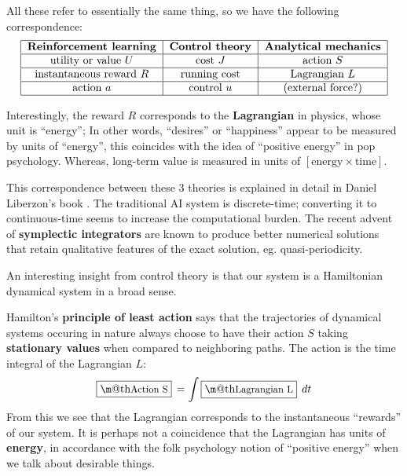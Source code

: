 \documentclass[orivec]{llncs}
\makeatletter
\newcommand{\emp}[1]{\textbf{#1}}
\renewcommand{\boxed}[1]{\fbox{\m@th$\displaystyle\scalebox{0.9}{#1}$} \,}
\makeatother
\begin{document}
All these refer to essentially the same thing, so we have the following correspondence:
\begin{equation}
\begin{tabular}{|c|c|c|}
\hline 
\emp{Reinforcement learning} & \emp{Control theory} & \emp{Analytical mechanics} \\ 
\hline
utility or value $U$ & cost $J$ & action $S$ \\ 
\hline 
instantaneous reward $R$ & running cost & Lagrangian $L$ \\ 
\hline 
action $a$ & control $u$ & (external force?) \\
\hline
\end{tabular} 
\end{equation}


Interestingly, the reward $R$ corresponds to the \textbf{Lagrangian} in physics, whose unit is ``energy'';  In other words, ``desires'' or ``happiness'' appear to be measured by units of ``energy'', this coincides with the idea of ``positive energy'' in pop psychology.  Whereas, long-term value is measured in units of $[\mbox{energy} \times \mbox{time}]$.


This correspondence between these 3 theories is explained in detail in Daniel Liberzon's book \cite{Liberzon2012}.  The traditional AI system is discrete-time; converting it to continuous-time seems to increase the computational burden.  The recent advent of \textbf{symplectic integrators} \cite{Leimkuhler2009} are known to produce better numerical solutions that retain qualitative features of the exact solution, eg. quasi-periodicity.

An interesting insight from control theory is that our system is a Hamiltonian dynamical system in a broad sense.

Hamilton's \emp{principle of least action} says that the trajectories of dynamical systems occuring in nature always choose to have their action $S$ taking \textbf{stationary values} when compared to neighboring paths.  The action is the time integral of the Lagrangian $L$:
\begin{equation}
\boxed{\mbox{Action} S} = \int \boxed{\mbox{Lagrangian} L} \; dt
\end{equation}
From this we see that the Lagrangian corresponds to the instantaneous ``rewards'' of our system.  It is perhaps not a coincidence that the Lagrangian has units of \textbf{energy}, in accordance with the folk psychology notion of ``positive energy'' when we talk about desirable things.
\end{document}

